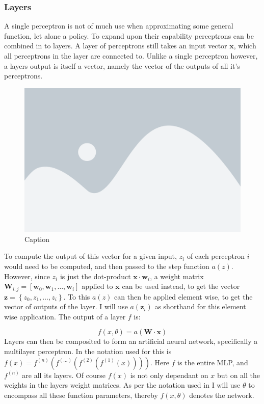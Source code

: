 \subsubsection{Layers}\label{subsubsec:nn:comp:layers}
A single perceptron is not of much use when approximating some general function, let alone a policy. To expand upon their capability perceptrons can be combined in to layers. A layer of perceptrons still takes an input vector $\mathbf{x}$, which all perceptrons in the layer are connected to. Unlike a single perceptron however, a layers output is itself a vector, namely the vector of the outputs of all it's perceptrons.

\begin{figure}[H]
    \centering
    \includegraphics[width=0.6\linewidth]{figures/placeholder.png}
    \caption{Caption}
    \label{fig:my_label_1}
\end{figure}
\noindent
To compute the output of this vector for a given input, $z_i$ of each perceptron $i$ would need to be computed, and then passed to the step function $a(z)$. However, since $z_i$ is just the dot-product $\mathbf{x} \cdot \mathbf{w}_i$, a weight matrix $\mathbf{W}_{i, j} = \left[ \mathbf{w}_0, \mathbf{w}_1, \dots, \mathbf{w}_i \right]$ applied to $\mathbf{x}$ can be used instead, to get the vector $\mathbf{z} = \left\{ z_0, z_1, \dots, z_i \right\}$. To this $a(z)$ can then be applied element wise, to get the vector of outputs of the layer. I will use $a(\mathbf{z}_i)$ as shorthand for this element wise application. The output of a layer $f$ is:

\begin{equation}
    f(x, \theta) = a \left( \mathbf{W} \cdot \mathbf{x} \right)
\end{equation}
\noindent
Layers can then be composited to form an artificial neural network, specifically a multilayer perceptron. In \cite[p. 164]{Goodfellow-et-al-2016} the notation used for this is $f(x) = f^{(n)}(f^{(\dots)}(f^{(2)}(f^{(1)}(x))))$. Here $f$ is the entire MLP, and $f^{(n)}$ are all its layers. Of course $f(x)$ is not only dependant on $x$ but on all the weights in the layers weight matrices. As per the notation used in \cite{Goodfellow-et-al-2016} I will use $\theta$ to encompass all these function parameters, thereby $f(x, \theta)$ denotes the network. 

